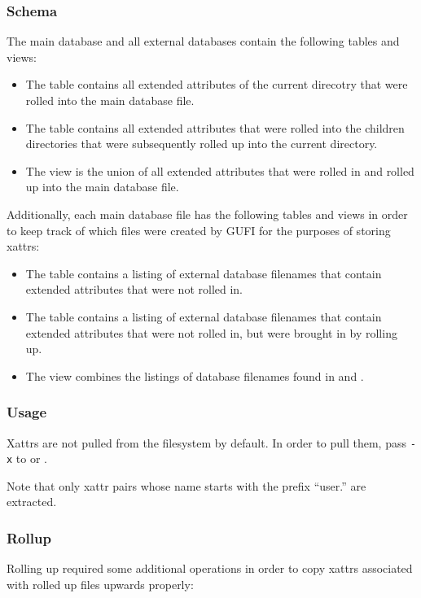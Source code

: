 \subsubsection{Schema}
The main database and all external databases contain the following
tables and views:

\begin{itemize}
\item The \xattrspwd table contains all extended attributes of the
  current direcotry that were rolled into the main database file.

\item The \xattrsrollup table contains all extended attributes that
  were rolled into the children directories that were subsequently
  rolled up into the current directory.

\item The \xattrsavail view is the union of all extended attributes
  that were rolled in and rolled up into the main database file.
\end{itemize}

Additionally, each main database file has the following tables and
views in order to keep track of which files were created by GUFI for
the purposes of storing xattrs:

\begin{itemize}
\item The \xattrfilespwd table contains a listing of external database
  filenames that contain extended attributes that were not rolled in.
\item The \xattrfilesrollup table contains a listing of external
  database filenames that contain extended attributes that were not
  rolled in, but were brought in by rolling up.
\item The \xattrfiles view combines the listings of database filenames
  found in \xattrfilespwd and \xattrfilesrollup.
\end{itemize}

\subsubsection{Usage}
Xattrs are not pulled from the filesystem by default. In order to pull
them, pass \texttt{-x} to \gufidirindex or \gufidirtrace.

Note that only xattr pairs whose name starts with the prefix ``user.''
are extracted.

\subsubsection{Rollup}
Rolling up required some additional operations in order to copy xattrs
associated with rolled up files upwards properly:

